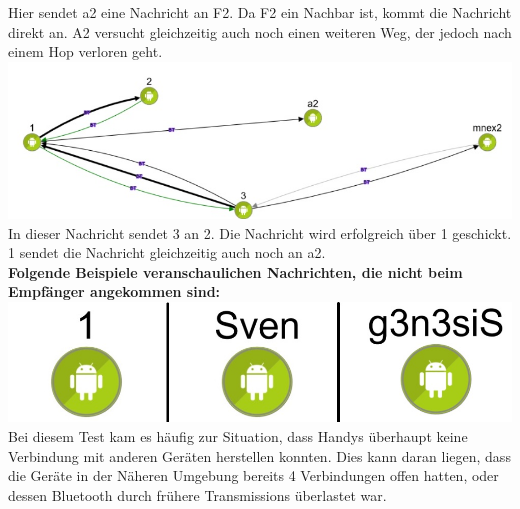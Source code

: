Hier sendet a2 eine Nachricht an F2. Da F2 ein Nachbar ist, kommt die
Nachricht direkt an. A2 versucht gleichzeitig auch noch einen weiteren
Weg, der jedoch nach einem Hop verloren geht.\\
\includegraphics[width=1.0\textwidth]{belege/grosstests/Bilder/Grosstest2/Test1Erfolg3.jpg}\\
In dieser Nachricht sendet 3 an 2. Die Nachricht wird erfolgreich über 1
geschickt. 1 sendet die Nachricht gleichzeitig auch noch an a2.
\\
\textbf{Folgende Beispiele veranschaulichen Nachrichten, die nicht beim
Empfänger angekommen sind:}\\
\includegraphics[width=1.0\textwidth]{belege/grosstests/Bilder/Grosstest2/Test1Misserfolg2.jpg}\\
Bei diesem Test kam es häufig zur Situation, dass Handys überhaupt keine
Verbindung mit anderen Geräten herstellen konnten. Dies kann daran
liegen, dass die Geräte in der Näheren Umgebung bereits 4 Verbindungen
offen hatten, oder dessen Bluetooth durch frühere Transmissions
überlastet war.\\

